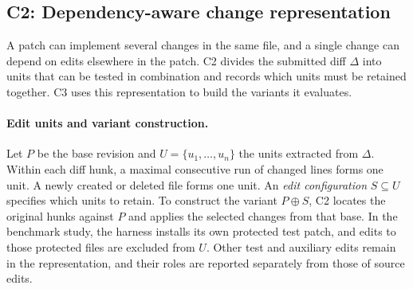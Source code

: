 \documentclass[a4paper,fleqn]{cas-sc}
\begin{document}





















\subsection{C2: Dependency-aware change representation}\label{sec:decomposition}

A patch can implement several changes in the same file, and a single change can depend on edits elsewhere in the patch. C2 divides the submitted diff $\Delta$ into units that can be tested in combination and records which units must be retained together. C3 uses this representation to build the variants it evaluates.

\paragraph{Edit units and variant construction.} Let $P$ be the base revision and $U=\{u_1,\ldots,u_n\}$ the units extracted from $\Delta$. Within each diff hunk, a maximal consecutive run of changed lines forms one unit. A newly created or deleted file forms one unit. An \emph{edit configuration} $S\subseteq U$ specifies which units to retain. To construct the variant $P\oplus S$, C2 locates the original hunks against $P$ and applies the selected changes from that base. In the benchmark study, the harness installs its own protected test patch, and edits to those protected files are excluded from $U$. Other test and auxiliary edits remain in the representation, and their roles are reported separately from those of source edits.
\end{document}
